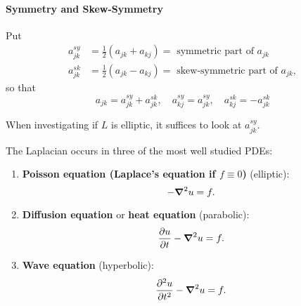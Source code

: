\bigskip
\paragraph{Symmetry and Skew-Symmetry}
Put
\begin{align*}
    a_{jk}^{sy} & = \frac{1}{2} (a_{jk} + a_{kj}) = \text{ symmetric part of } a_{jk}       \\
    a_{jk}^{sk} & = \frac{1}{2} (a_{jk} - a_{kj}) = \text{ skew-symmetric part of } a_{jk},
\end{align*}
so that
\[a_{jk} = a_{jk}^{sy} + a_{jk}^{sk}, \quad a_{kj}^{sy} = a_{jk}^{sy}, \quad a_{kj}^{sk} = -a_{jk}^{sk}\]

When investigating if \(L\) is elliptic, it suffices to look at \(a_{jk}^{sy}\).




\bigskip
The Laplacian occurs in three of the most well studied PDEs:
\begin{enumerate}
    \item \textbf{Poisson equation (Laplace's equation if \(f \equiv 0\))} (elliptic):
          \[-\grad^2 u = f.\]
    \item \textbf{Diffusion equation} or \textbf{heat equation} (parabolic):
          \[\frac{\partial u}{\partial t} -\grad^2 u = f.\]
    \item \textbf{Wave equation} (hyperbolic):
          \[\frac{\partial^2 u}{\partial t^2} -\grad^2 u = f.\]
\end{enumerate}